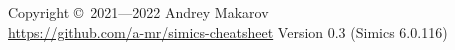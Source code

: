 \documentclass[8pt]{extarticle}
\begin{document}
\begin{multicols*}{3}
\begin{itemize}[left=1.5em]
        \begin{minipage}[t]{\linewidth}
        \end{minipage}
\end{itemize}

Copyright \copyright\ 2021—2022 Andrey Makarov \\
\href{https://github.com/a-mr/simics-cheatsheet}{https://github.com/a-mr/simics-cheatsheet}
Version 0.3 (Simics 6.0.116)

\ifdefined\cheatsheetCompact
\end{multicols*}
\fi
\end{document}
